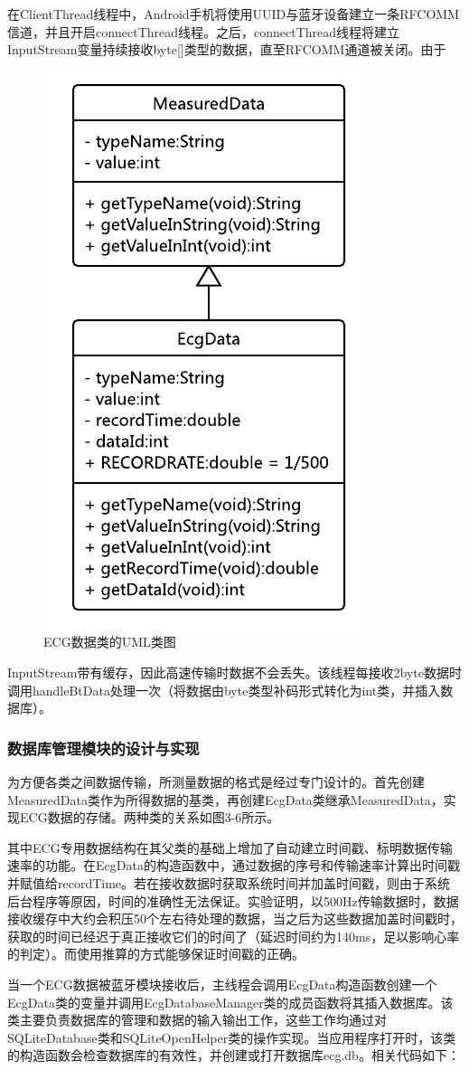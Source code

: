 在ClientThread线程中，Android手机将使用UUID与蓝牙设备建立一条RFCOMM信道，并且开启connectThread线程。之后，connectThread线程将建立InputStream变量持续接收byte[]类型的数据，直至RFCOMM通道被关闭。由于
\begin{figure}%
\label{fig3-8}
\setlength{\belowcaptionskip}{-20pt}
\setlength{\abovecaptionskip}{0pt}
\includegraphics[width=0.4\columnwidth]{fig3-8.png}
\caption{ECG数据类的UML类图}
\end{figure}
InputStream带有缓存，因此高速传输时数据不会丢失。该线程每接收2byte数据时调用handleBtData处理一次（将数据由byte类型补码形式转化为int类，并插入数据库）。

\subsubsection{数据库管理模块的设计与实现}
为方便各类之间数据传输，所测量数据的格式是经过专门设计的。首先创建MeasuredData类作为所得数据的基类，再创建EcgData类继承MeasuredData，实现ECG数据的存储。两种类的关系如图3-6所示。

其中ECG专用数据结构在其父类的基础上增加了自动建立时间戳、标明数据传输速率的功能。在EcgData的构造函数中，通过数据的序号和传输速率计算出时间戳并赋值给recordTime。若在接收数据时获取系统时间并加盖时间戳，则由于系统后台程序等原因，时间的准确性无法保证。实验证明，以500Hz传输数据时，数据接收缓存中大约会积压50个左右待处理的数据，当之后为这些数据加盖时间戳时，获取的时间已经迟于真正接收它们的时间了（延迟时间约为140ms，足以影响心率的判定）。而使用推算的方式能够保证时间戳的正确。

当一个ECG数据被蓝牙模块接收后，主线程会调用EcgData构造函数创建一个EcgData类的变量并调用EcgDatabaseManager类的成员函数将其插入数据库。该类主要负责数据库的管理和数据的输入输出工作，这些工作均通过对SQLiteDatabase类和SQLiteOpenHelper类的操作实现。当应用程序打开时，该类的构造函数会检查数据库的有效性，并创建或打开数据库ecg.db。相关代码如下：

